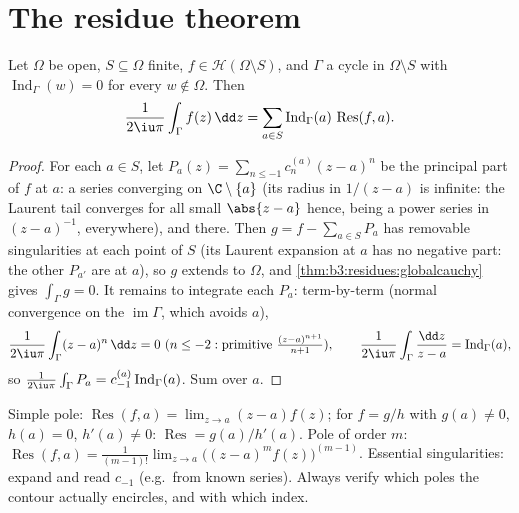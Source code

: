\section{The residue theorem}

\begin{theorem}\label{thm:b3:residues:residue}
Let $\Omega$ be open, $S \subseteq \Omega$ finite, $f \in
\mathcal H(\Omega\setminus S)$, and $\Gamma$ a cycle in
$\Omega\setminus S$ with $\operatorname{Ind}_\Gamma(w) = 0$
for every $w \notin \Omega$. Then
\[
\frac{1}{2\iu\pi}\int_\Gamma f(z)\,\dd z
= \sum_{a\in S}\operatorname{Ind}_\Gamma(a)\,
\operatorname{Res}(f, a) .
\]
\end{theorem}

\begin{proof}
For each $a \in S$, let $P_a(z) = \sum_{n\leq-1}c_n^{(a)}(z -
a)^n$ be the principal part of $f$ at $a$: a series
converging on $\C\setminus\{a\}$ (its radius in $1/(z-a)$ is
infinite: the Laurent tail converges for all small $\abs{z-a}$
hence, being a power series in $(z-a)^{-1}$, everywhere), and
 there. Then $g = f - \sum_{a\in S}P_a$ has
removable singularities at each point of $S$ (its Laurent
expansion at $a$ has no negative part: the other $P_{a'}$ are
 at $a$), so $g$ extends  to
$\Omega$, and \cref{thm:b3:residues:globalcauchy} gives
$\int_\Gamma g = 0$. It remains to integrate each $P_a$:
term-by-term (normal convergence on the 
$\operatorname{im}\Gamma$, which avoids $a$),
\[
\frac1{2\iu\pi}\int_\Gamma(z - a)^n\,\dd z = 0 \ (n \leq -2:
\text{primitive } \tfrac{(z-a)^{n+1}}{n+1}),
\qquad
\frac1{2\iu\pi}\int_\Gamma\frac{\dd z}{z - a} =
\operatorname{Ind}_\Gamma(a),
\]
so $\frac1{2\iu\pi}\int_\Gamma P_a =
c_{-1}^{(a)}\operatorname{Ind}_\Gamma(a)$. Sum over $a$.
\end{proof}

\begin{method}\label{met:b3:residues:compute}
Simple pole: $\operatorname{Res}(f, a) = \lim_{z\to a}(z -
a)f(z)$; for $f = g/h$ with $g(a) \neq 0$, $h(a) = 0$, $h'(a)
\neq 0$: $\operatorname{Res} = g(a)/h'(a)$. Pole of order $m$:
$\operatorname{Res}(f, a) = \frac1{(m-1)!}\lim_{z\to
a}\bigl((z-a)^mf(z)\bigr)^{(m-1)}$. Essential singularities:
expand and read $c_{-1}$ (e.g.\ from known series). Always
verify which poles the contour actually encircles, and with
which index.
\end{method}

